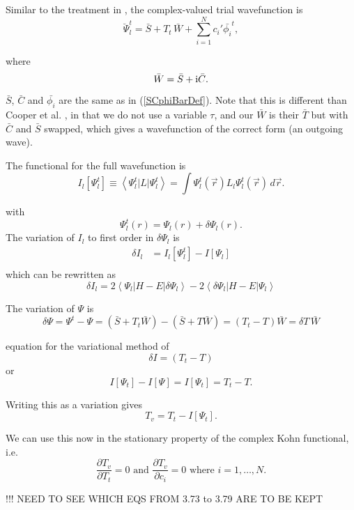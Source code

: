\documentclass[preprint,showpacs,preprintnumbers,amsmath,amssymb]{revtex4}
\newcommand{\beq}{\begin{equation}}
\newcommand{\eeq}{\end{equation}}
\newcommand{\ii}{{\rm{i}}}
\begin{document}
Similar to the treatment in \cite{Cooper2010}, the complex-valued trial wavefunction is
\beq
\breve{\Psi}_l^t = \bar{S} + T_t \, \bar{W} + \sum_{i=1}^N c_i' \bar{\phi_i}^t,
\label{eq:TrialComplex}
\eeq

where
\beq
\bar{W} = \bar{S} + \ii \bar{C}.
\label{eq:WDef}
\eeq

$\bar{S}$, $\bar{C}$ and $\bar{\phi_i}$ are the same as in (\ref{SCphiBarDef}).  Note that this is different than Cooper et al. \cite{Cooper2010}, in that we do not use a variable $\tau$, and our $\bar{W}$ is their $\bar{T}$ but with $\bar{C}$ and $\bar{S}$ swapped, which gives a wavefunction of the correct form (an outgoing wave).

The functional  for the full wavefunction is
\beq
I_l[\Psi_l^t] \equiv \left<\Psi_l^t | L | \Psi_l^t \right> = \int \Psi_l^t(\vec{r}) L_l \Psi_l^t(\vec{r}) \,d\vec{r}.
\label{eq:IlDefPsi}
\eeq

\noindent with
\beq
\Psi_l^t(r) = \Psi_l(r) + \delta \Psi_l(r).
\label{eq:PsilTrialRelation}
\eeq
\noindent The variation of $I_l$ to first order in $\delta\Psi_l$ is
\begin{align}
\nonumber \delta I_l &= I_l[\Psi_l^t] - I[\Psi_l] \\
\label{eq:IlPsiVariation1}
\end{align}
which can be rewritten as 
\beq
\delta I_l = 2 \left<\Psi_l | H\!-\!E | \delta\Psi_l\right> - 2 \left<\delta\Psi_l | H\!-\!E | \Psi_l\right>
\label{eq:IlPsiVariation2}
\eeq



The variation of $\Psi$ is
\beq
\delta\Psi = \Psi^t - \Psi = (\bar{S} + T_t \bar{W}) - (\bar{S} + T \bar{W}) = (T_t - T) \bar{W} = \delta T \,\bar{W}
\eeq

equation for the variational method of
\beq
\delta I = (T_t - T)
\eeq
or
\beq
I[\Psi_t] - I[\Psi] = I[\Psi_t] = T_t - T.
\eeq

\noindent Writing this as a variation gives
\beq
T_v = T_t - I[\Psi_t].
\label{eq:ComplexKohnVariation}
\eeq





We can use this now in the stationary property of the complex Kohn functional, i.e.
\beq
\frac{\partial T_v}{\partial T_t} = 0  \text{ and } \frac{\partial T_v}{\partial c_i} = 0 \text{ where $i = 1,\ldots,N$}.
\label{eq:ComplexKohnStationary}
\eeq

!!! NEED TO SEE WHICH EQS FROM 3.73 to 3.79 ARE TO BE KEPT
\end{document}
